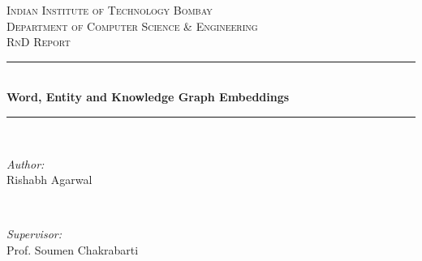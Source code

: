 \documentclass[12pt]{article}
\begin{document}
\begin{titlepage}

\newcommand{\HRule}{\rule{\linewidth}{0.5mm}} %


\center %
 

\textsc{\LARGE Indian Institute of Technology Bombay}\\[1cm] %
\textsc{\Large Department of Computer Science \& Engineering}\\[0.5cm] %
\textsc{\large RnD Report}\\[0.5cm] %


\HRule \\[0.4cm]
{ \huge \bfseries Word, Entity and Knowledge Graph Embeddings}\\[0.4cm] %
\HRule \\[1.5cm]
 

\begin{minipage}{0.4\textwidth}
\begin{flushleft} \large
\emph{Author:}\\
Rishabh Agarwal %
\end{flushleft}
\end{minipage}
~
\begin{minipage}{0.4\textwidth}
\begin{flushright} \large
\emph{Supervisor:} \\
Prof. Soumen Chakrabarti %
\end{flushright}
\end{minipage}\\[2cm]



\end{titlepage}
\end{document}
